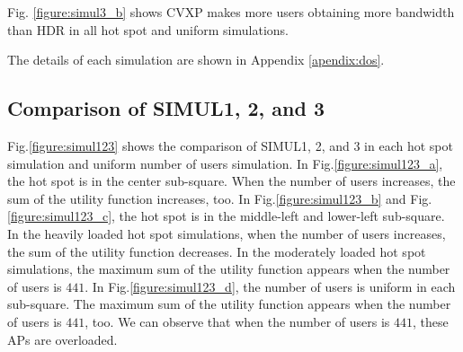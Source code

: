 	Fig. \ref{figure:simul3_b} shows CVXP makes more users obtaining more bandwidth than HDR in all hot spot and uniform simulations.
	
	The details of each simulation are shown in Appendix \ref{apendix:dos}.

\subsection{Comparison of SIMUL1, 2, and 3}
	Fig.\ref{figure:simul123} shows the comparison of SIMUL1, 2, and 3 in each hot spot simulation and uniform number of users simulation. In Fig.\ref{figure:simul123_a}, the hot spot is in the center sub-square. When the number of users increases, the sum of the utility function increases, too. In Fig.\ref{figure:simul123_b} and Fig.\ref{figure:simul123_c}, the hot spot is in the middle-left and lower-left sub-square. In the heavily loaded hot spot simulations, when the number of users increases, the sum of the utility function decreases. In the moderately loaded hot spot simulations, the maximum sum of the utility function appears when the number of users is $441$. In Fig.\ref{figure:simul123_d}, the number of users is uniform in each sub-square. The maximum sum of the utility function appears when the number of users is $441$, too. We can observe that when the number of users is $441$, these APs are overloaded.

